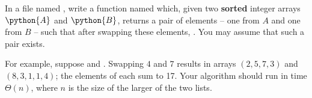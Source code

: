 \begin{prob}
    In a file named , write a function named 
    which, given two \textbf{sorted}
    integer arrays $\python{A}$ and $\python{B}$, returns a pair of elements  --
    one from $A$ and one from $B$ -- such that after swapping these elements,
    . You may assume that such a pair exists.

    For example, suppose  and . 
    Swapping $4$ and $7$ results in arrays $(2,5,7,3)$ and
    $(8,3,1,1,4)$; the elements of each sum to 17. Your algorithm should run in
    time $\Theta(n)$, where $n$ is the size of the larger of the two lists.
\end{prob}
